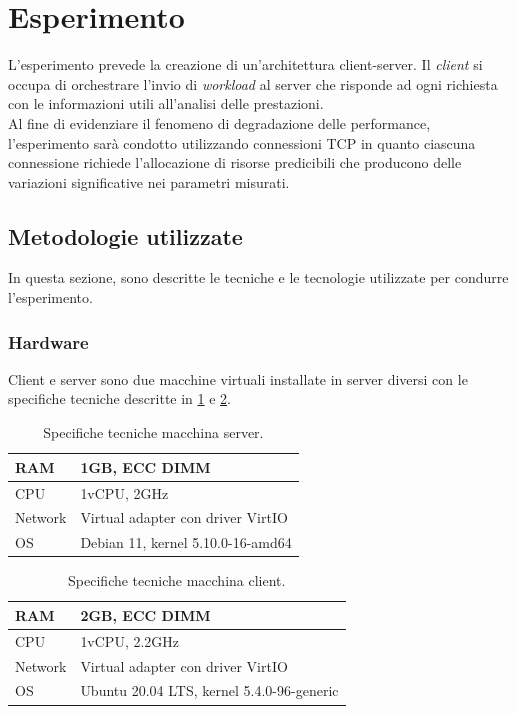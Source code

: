 \section{Esperimento}\label{ch:esperimento}

L'esperimento prevede la creazione di un'architettura client-server. Il \textit{client} si occupa di orchestrare l'invio di \textit{workload} al server che risponde ad ogni richiesta con le informazioni utili all'analisi delle prestazioni.\\
Al fine di evidenziare il fenomeno di degradazione delle performance, l'esperimento sarà condotto utilizzando connessioni TCP in quanto ciascuna connessione richiede l'allocazione di risorse predicibili che producono delle variazioni significative nei parametri misurati.

\subsection{Metodologie utilizzate}\label{s:metodologie}
In questa sezione, sono descritte le tecniche e le tecnologie utilizzate per condurre l'esperimento.

\subsubsection{Hardware}
Client e server sono due macchine virtuali installate in server diversi con le specifiche tecniche descritte in \cref{tab:server_spec} e \cref{tab:client_spec}.

\begin{table}
    \centering
    \begin{tabular}{|p{2.5cm}||p{9cm}| }
        \hline
         RAM& 1GB, ECC DIMM\\
         \hline
         \hline
         CPU& 1vCPU, 2GHz\\
         \hline
         \hline
         Network& Virtual adapter con driver VirtIO\\
         \hline
         \hline
         OS& Debian 11, kernel 5.10.0-16-amd64\\
         \hline
    \end{tabular}
    \caption{Specifiche tecniche macchina server.}
    \label{tab:server_spec}
\end{table}

\begin{table}
    \centering
    \begin{tabular}{|p{2.5cm}||p{9cm}| }
        \hline
         RAM& 2GB, ECC DIMM\\
         \hline
         \hline
         CPU& 1vCPU, 2.2GHz\\
         \hline
         \hline
         Network& Virtual adapter con driver VirtIO\\
         \hline
         \hline
         OS& Ubuntu 20.04 LTS, kernel 5.4.0-96-generic\\
         \hline
    \end{tabular}
    \caption{Specifiche tecniche macchina client.}
    \label{tab:client_spec}
\end{table}

